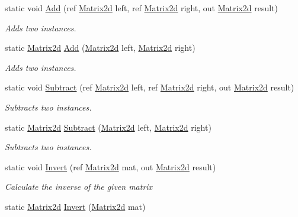 \begin{DoxyCompactItemize}
static void \hyperlink{struct_open_t_k_1_1_matrix2d_aeebe824f141dbc823819f5e714884cb3}{Add} (ref \hyperlink{struct_open_t_k_1_1_matrix2d}{Matrix2d} left, ref \hyperlink{struct_open_t_k_1_1_matrix2d}{Matrix2d} right, out \hyperlink{struct_open_t_k_1_1_matrix2d}{Matrix2d} result)
\begin{DoxyCompactList}\small\item\em Adds two instances. \end{DoxyCompactList}\item 
static \hyperlink{struct_open_t_k_1_1_matrix2d}{Matrix2d} \hyperlink{struct_open_t_k_1_1_matrix2d_a267bea58c3586ac206d00e3e46a3e17f}{Add} (\hyperlink{struct_open_t_k_1_1_matrix2d}{Matrix2d} left, \hyperlink{struct_open_t_k_1_1_matrix2d}{Matrix2d} right)
\begin{DoxyCompactList}\small\item\em Adds two instances. \end{DoxyCompactList}\item 
static void \hyperlink{struct_open_t_k_1_1_matrix2d_a57ae875f6781e479aef19d70e5391bf9}{Subtract} (ref \hyperlink{struct_open_t_k_1_1_matrix2d}{Matrix2d} left, ref \hyperlink{struct_open_t_k_1_1_matrix2d}{Matrix2d} right, out \hyperlink{struct_open_t_k_1_1_matrix2d}{Matrix2d} result)
\begin{DoxyCompactList}\small\item\em Subtracts two instances. \end{DoxyCompactList}\item 
static \hyperlink{struct_open_t_k_1_1_matrix2d}{Matrix2d} \hyperlink{struct_open_t_k_1_1_matrix2d_ab7f3bcb739b216617311a429dee8d3e8}{Subtract} (\hyperlink{struct_open_t_k_1_1_matrix2d}{Matrix2d} left, \hyperlink{struct_open_t_k_1_1_matrix2d}{Matrix2d} right)
\begin{DoxyCompactList}\small\item\em Subtracts two instances. \end{DoxyCompactList}\item 
static void \hyperlink{struct_open_t_k_1_1_matrix2d_aa14a64d806cc05add50d1e3ac68b78c2}{Invert} (ref \hyperlink{struct_open_t_k_1_1_matrix2d}{Matrix2d} mat, out \hyperlink{struct_open_t_k_1_1_matrix2d}{Matrix2d} result)
\begin{DoxyCompactList}\small\item\em Calculate the inverse of the given matrix \end{DoxyCompactList}\item 
static \hyperlink{struct_open_t_k_1_1_matrix2d}{Matrix2d} \hyperlink{struct_open_t_k_1_1_matrix2d_a33586cd6a22b0ef9bd393912ba89b4ef}{Invert} (\hyperlink{struct_open_t_k_1_1_matrix2d}{Matrix2d} mat)

\end{DoxyCompactItemize}
